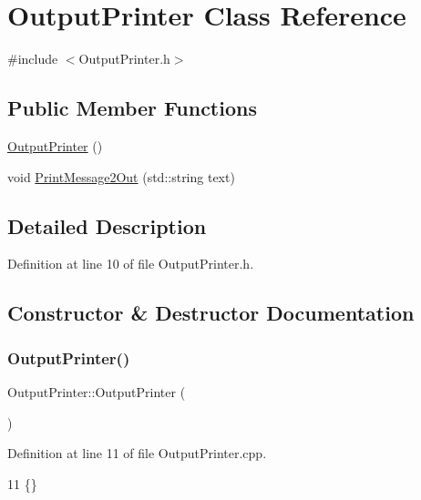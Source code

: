 \hypertarget{classOutputPrinter}{}\section{Output\+Printer Class Reference}
\label{classOutputPrinter}


{\ttfamily \#include $<$Output\+Printer.\+h$>$}

\subsection*{Public Member Functions}
\begin{DoxyCompactItemize}
\item 
\hyperlink{classOutputPrinter_abbf799e4a04980138e93d633beb5e58b}{Output\+Printer} ()
\item 
void \hyperlink{classOutputPrinter_ae9cd642df56fb6febef4cccff7ca12f2}{Print\+Message2\+Out} (std\+::string text)
\end{DoxyCompactItemize}


\subsection{Detailed Description}


Definition at line 10 of file Output\+Printer.\+h.



\subsection{Constructor \& Destructor Documentation}
\mbox{\label{classOutputPrinter_abbf799e4a04980138e93d633beb5e58b}} 
\subsubsection{\texorpdfstring{Output\+Printer()}{OutputPrinter()}}
{\footnotesize\ttfamily Output\+Printer\+::\+Output\+Printer (\begin{DoxyParamCaption}{ }\end{DoxyParamCaption})}



Definition at line 11 of file Output\+Printer.\+cpp.


\begin{DoxyCode}
11 \{\}
\end{DoxyCode}


